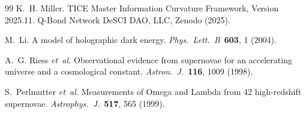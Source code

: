 \documentclass[12pt,a4paper]{article}
\begin{document}
\begin{thebibliography}{99}
K.~H. Miller.
\newblock TICE Master Information Curvature Framework, Version 2025.11.
\newblock Q-Bond Network DeSCI DAO, LLC, Zenodo (2025).

M.~Li.
\newblock A model of holographic dark energy.
\newblock \textit{Phys.\ Lett.\ B}\ \textbf{603}, 1 (2004).

A.~G. Riess \textit{et~al.}
\newblock Observational evidence from supernovae for an accelerating universe and a cosmological constant.
\newblock \textit{Astron.\ J.}\ \textbf{116}, 1009 (1998).

S.~Perlmutter \textit{et~al.}
\newblock Measurements of Omega and Lambda from 42 high-redshift supernovae.
\newblock \textit{Astrophys.\ J.}\ \textbf{517}, 565 (1999).

\end{thebibliography}
\end{document}
